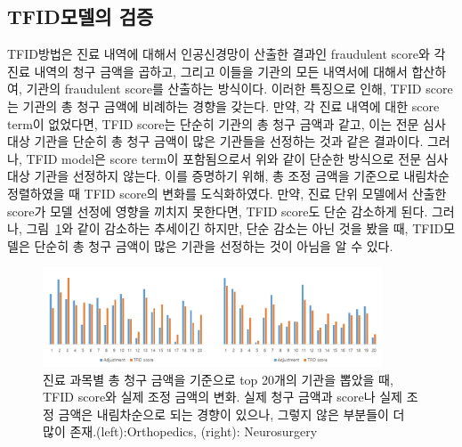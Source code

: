 \documentclass[11pt]{article}           %
\begin{document}
\subsection{TFID모델의 검증}
\label{5.3}
TFID방법은 진료 내역에 대해서 인공신경망이 산출한 결과인 fraudulent score와 각 진료 내역의 청구 금액을 곱하고, 그리고 이들을 기관의 모든 내역서에 대해서 합산하여, 기관의 fraudulent score를 산출하는 방식이다.
이러한 특징으로 인해, TFID score는 기관의 총 청구 금액에 비례하는 경향을 갖는다.
만약, 각 진료 내역에 대한 score term이 없었다면, TFID score는 단순히 기관의 총 청구 금액과 같고, 이는 전문 심사 대상 기관을 단순히 총 청구 금액이 많은 기관들을 선정하는 것과 같은 결과이다.
그러나, TFID model은 score term이 포함됨으로서 위와 같이 단순한 방식으로 전문 심사 대상 기관을 선정하지 않는다.
이를 증명하기 위해, 총 조정 금액을 기준으로 내림차순 정렬하였을 때 TFID score의 변화를 도식화하였다.
만약, 진료 단위 모델에서 산출한 score가 모델 선정에 영향을 끼치지 못한다면, TFID score도 단순 감소하게 된다.
그러나, 그림~\ref{fig:ADJ TFID wrt AMT}와 같이 감소하는 추세이긴 하지만, 단순 감소는 아닌 것을 봤을 때, TFID모델은 단순히 총 청구 금액이 많은 기관을 선정하는 것이 아님을 알 수 있다.

\begin{figure}[h]
   \centering
   \vspace{0.5cm}
   \includegraphics[width=0.9\textwidth]{[figure10]ADJ_TFID_wrt_AMT.jpg}
   \vspace{-0.5cm}
   \caption{진료 과목별 총 청구 금액을 기준으로 top 20개의 기관을 뽑았을 때, TFID score와 실제 조정 금액의 변화. 실제 청구 금액과 score나 실제 조정 금액은 내림차순으로 되는 경향이 있으나, 그렇지 않은 부분들이 더 많이 존재.(left):Orthopedics, (right): Neurosurgery }
   \vspace{0.5cm}
   \label{fig:ADJ TFID wrt AMT}
\end{figure}
\end{document}
